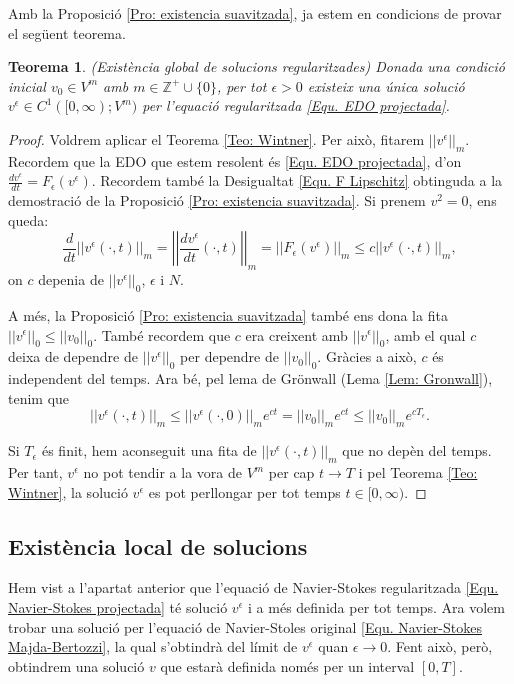 \documentclass{article}
\numberwithin{equation}{section}
\newtheorem{teorema}{Teorema}[section]
\begin{document}
Amb la Proposici\'{o} \ref{Pro: existencia suavitzada}, ja estem en condicions de provar el seg\"{u}ent teorema.

\begin{teorema}
(Exist\`{e}ncia global de solucions regularitzades) Donada una condici\'{o} inicial $v_0\in V^m$ amb $m\in\mathbb{Z}^+\cup\{0\}$, per tot $\epsilon>0$ existeix una \'{u}nica soluci\'{o} $v^{\epsilon}\in C^1([0,\infty);V^m)$ per l'equaci\'{o} regularitzada \eqref{Equ. EDO projectada}.
\end{teorema}
\begin{proof}
Voldrem aplicar el Teorema \ref{Teo: Wintner}. Per aix\`{o}, fitarem $||v^{\epsilon}||_m$. Recordem que la EDO que estem resolent \'{e}s \eqref{Equ. EDO projectada}, d'on $\frac{dv^{\epsilon}}{dt}=F_{\epsilon}(v^{\epsilon})$. Recordem tamb\'{e} la Desigualtat \eqref{Equ. F Lipschitz} obtinguda a la demostraci\'{o} de la Proposici\'{o} \ref{Pro: existencia suavitzada}. Si prenem $v^2=0$, ens queda:
\[\frac{d}{dt}||v^{\epsilon}(\cdot,t)||_m=\left|\left|\frac{dv^{\epsilon}}{dt}(\cdot,t)\right|\right|_m=||F_{\epsilon}(v^{\epsilon})||_m\leq c||v^{\epsilon}(\cdot,t)||_m,\]
on $c$ depenia de $||v^{\epsilon}||_0$, $\epsilon$ i $N$.

A m\'{e}s, la Proposici\'{o} \ref{Pro: existencia suavitzada} tamb\'{e} ens dona la fita $||v^{\epsilon}||_0\leq||v_0||_0$. Tamb\'{e} recordem que $c$ era creixent amb $||v^{\epsilon}||_0$, amb el qual $c$ deixa de dependre de $||v^{\epsilon}||_0$ per dependre de $||v_0||_0$. Gr\`{a}cies a aix\`{o}, $c$ \'{e}s independent del temps. Ara b\'{e}, pel lema de Gr\"{o}nwall (Lema \ref{Lem: Gronwall}), tenim que
\[||v^{\epsilon}(\cdot,t)||_m\leq||v^{\epsilon}(\cdot,0)||_me^{ct}=||v_0||_me^{ct}\leq||v_0||_me^{cT_{\epsilon}}.\]

Si $T_{\epsilon}$ \'{e}s finit, hem aconseguit una fita de $||v^{\epsilon}(\cdot,t)||_m$ que no dep\`{e}n del temps. Per tant, $v^{\epsilon}$ no pot tendir a la vora de $V^m$ per cap $t\to T$ i pel Teorema \ref{Teo: Wintner}, la soluci\'{o} $v^{\epsilon}$ es pot perllongar per tot temps $t\in[0,\infty)$.
\end{proof}

\subsection{Exist\`{e}ncia local de solucions}

Hem vist a l'apartat anterior que l'equaci\'{o} de Navier-Stokes regularitzada \eqref{Equ. Navier-Stokes projectada} t\'{e} soluci\'{o} $v^{\epsilon}$ i a m\'{e}s definida per tot temps. Ara volem trobar una soluci\'{o} per l'equaci\'{o} de Navier-Stoles original \eqref{Equ. Navier-Stokes Majda-Bertozzi}, la qual s'obtindr\`{a} del l\'{i}mit de $v^{\epsilon}$ quan $\epsilon\to0$. Fent aix\`{o}, per\`{o}, obtindrem una soluci\'{o} $v$ que estar\`{a} definida nom\'{e}s per un interval $[0,T]$.
\end{document}
